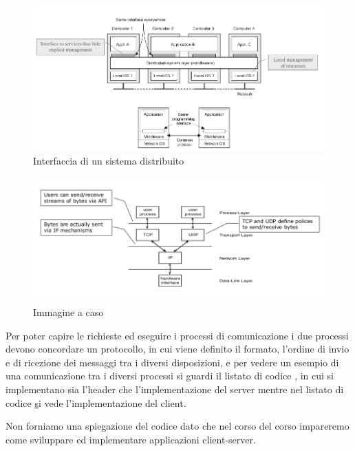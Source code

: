\documentclass[a4paper,12pt, oneside]{book}
\begin{document}
\begin{figure}
    \caption{Interfaccia di un sistema distribuito}
    \label{figura:interfaccia}
    \includegraphics[scale=2]{img/cli4.png}
\end{figure}

\begin{figure}
    \caption{Immagine a caso}
	\includegraphics[scale=2]{img/cli5.png}
\end{figure}
Per poter capire le richieste ed eseguire i processi di comunicazione i due processi devono concordare 
un protocollo, in cui viene definito il formato, l'ordine di invio e di ricezione dei messaggi tra 
i diversi disposizioni, e per vedere un esempio di una comunicazione tra i diversi processi si guardi
il listato di codice \href{listato:fileServer}, in cui si implementano sia l'header che l'implementazione
del server mentre nel listato di codice \href{listato:fileClient} si vede l'implementazione del client.

Non forniamo una spiegazione del codice dato che nel corso del corso impareremo come sviluppare ed
implementare applicazioni client-server.

\begin{figure}
    \label{listato:fileServer}
    \inputminted{c}{code/header.h}
    \inputminted{c}{code/fileServer.c}
\end{figure}
\end{document}
